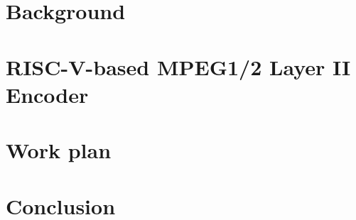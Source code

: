 \documentclass[10pt]{esda}
\begin{document}
\cleardoublepage
\section{Background}
\label{sec:back}


\cleardoublepage
\section{RISC-V-based MPEG1/2 Layer II Encoder}
\label{sec:curr}


\cleardoublepage
\section{Work plan}
\label{sec:plan}


\cleardoublepage
\section{Conclusion}
\label{sec:conc}


\cleardoublepage
{}


\end{document}

